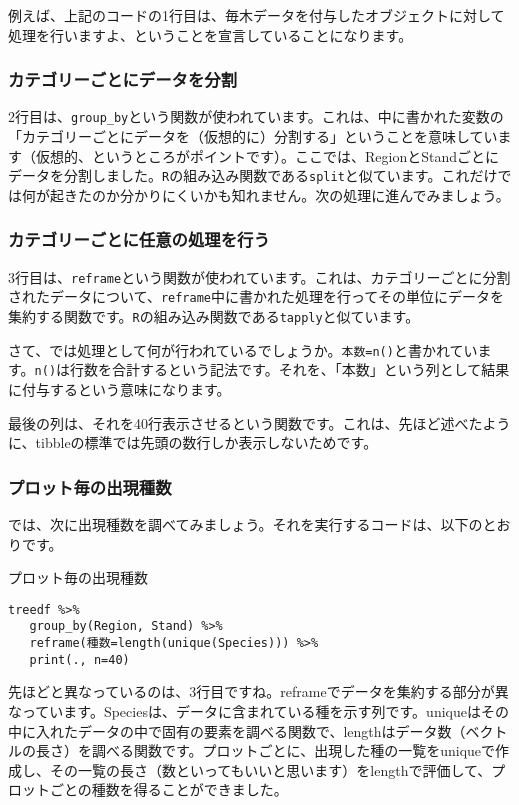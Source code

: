 例えば、上記のコードの1行目は、毎木データを付与したオブジェクトに対して処理を行いますよ、ということを宣言していることになります。

    \subsubsection{カテゴリーごとにデータを分割}
2行目は、\verb|group_by|という関数が使われています。これは、中に書かれた変数の「カテゴリーごとにデータを（仮想的に）分割する」ということを意味しています（仮想的、というところがポイントです）。ここでは、RegionとStandごとにデータを分割しました。\texttt{R}の組み込み関数である\verb|split|と似ています。これだけでは何が起きたのか分かりにくいかも知れません。次の処理に進んでみましょう。

    \subsubsection{カテゴリーごとに任意の処理を行う}
3行目は、\texttt{reframe}という関数が使われています。これは、カテゴリーごとに分割されたデータについて、\texttt{reframe}中に書かれた処理を行ってその単位にデータを集約する関数です。\texttt{R}の組み込み関数である\verb|tapply|と似ています。

さて、では処理として何が行われているでしょうか。\verb|本数=n()|と書かれています。\verb|n()|は行数を合計するという記法です。それを、「本数」という列として結果に付与するという意味になります。

最後の列は、それを40行表示させるという関数です。これは、先ほど述べたように、tibbleの標準では先頭の数行しか表示しないためです。

    \subsubsection{プロット毎の出現種数}
では、次に出現種数を調べてみましょう。それを実行するコードは、以下のとおりです。
\begin{itembox}[l]{プロット毎の出現種数}
\begin{verbatim}
treedf %>%
   group_by(Region, Stand) %>%
   reframe(種数=length(unique(Species))) %>%
   print(., n=40)
\end{verbatim}
\end{itembox}
先ほどと異なっているのは、3行目ですね。reframeでデータを集約する部分が異なっています。Speciesは、データに含まれている種を示す列です。uniqueはその中に入れたデータの中で固有の要素を調べる関数で、lengthはデータ数（ベクトルの長さ）を調べる関数です。プロットごとに、出現した種の一覧をuniqueで作成し、その一覧の長さ（数といってもいいと思います）をlengthで評価して、プロットごとの種数を得ることができました。

